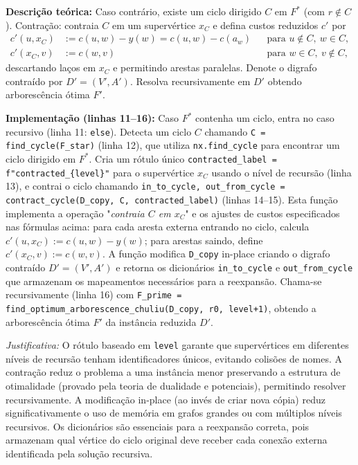 \begin{tcolorbox}[
        enhanced, breakable,
        colframe=green!60!black, colback=green!5,
        colbacktitle=green!20, coltitle=black,
        title={Passo 4: Contração e resolução recursiva (caso recursivo)},
        boxed title style={sharp corners, boxrule=0.6pt},
        sharp corners, boxrule=0.6pt
    ]
    \textbf{Descrição teórica:} Caso contrário, existe um ciclo dirigido \(C\) em \(F^*\) (com \(r\notin C\)). Contração: contraia \(C\) em um supervértice \(x_C\) e defina custos reduzidos \(c'\) por
    \begin{align*}
        c'(u,x_C) & := c(u,w) - y(w) = c(u,w) - c(a_w) &  & \text{para } u\notin C,\ w\in C, \\
        c'(x_C,v) & := c(w,v)                          &  & \text{para } w\in C,\ v\notin C,
    \end{align*}
    descartando laços em \(x_C\) e permitindo arestas paralelas. Denote o digrafo contraído por \(D'=(V',A')\). Resolva recursivamente em \(D'\) obtendo arborescência ótima \(F'\).

    \tcblower

    \textbf{Implementação (linhas 11--16):} Caso \(F^*\) contenha um ciclo, entra no caso recursivo (linha 11: \texttt{else}). Detecta um ciclo \(C\) chamando \texttt{C = find\_cycle(F\_star)} (linha 12), que utiliza \texttt{nx.find\_cycle} para encontrar um ciclo dirigido em \(F^*\). Cria um rótulo único \texttt{contracted\_label = f"contracted\_\{level\}"} para o supervértice \(x_C\) usando o nível de recursão (linha 13), e contrai o ciclo chamando \texttt{in\_to\_cycle, out\_from\_cycle = contract\_cycle(D\_copy, C, contracted\_label)} (linhas 14--15). Esta função implementa a operação "\emph{contraia \(C\) em \(x_C\)}" e os ajustes de custos especificados nas fórmulas acima: para cada aresta externa entrando no ciclo, calcula \(c'(u,x_C) := c(u,w) - y(w)\); para arestas saindo, define \(c'(x_C,v) := c(w,v)\). A função modifica \texttt{D\_copy} in-place criando o digrafo contraído \(D'=(V',A')\) e retorna os dicionários \texttt{in\_to\_cycle} e \texttt{out\_from\_cycle} que armazenam os mapeamentos necessários para a reexpansão. Chama-se recursivamente (linha 16) com \texttt{F\_prime = find\_optimum\_arborescence\_chuliu(D\_copy, r0, level+1)}, obtendo a arborescência ótima \(F'\) da instância reduzida \(D'\).

    \emph{Justificativa:} O rótulo baseado em \texttt{level} garante que supervértices em diferentes níveis de recursão tenham identificadores únicos, evitando colisões de nomes. A contração reduz o problema a uma instância menor preservando a estrutura de otimalidade (provado pela teoria de dualidade e potenciais), permitindo resolver recursivamente. A modificação in-place (ao invés de criar nova cópia) reduz significativamente o uso de memória em grafos grandes ou com múltiplos níveis recursivos. Os dicionários são essenciais para a reexpansão correta, pois armazenam qual vértice do ciclo original deve receber cada conexão externa identificada pela solução recursiva.
\end{tcolorbox}

